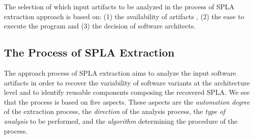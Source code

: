 \documentclass[graybox]{svmult}
\begin{document}
The selection of which input artifacts to be analyzed in the process of SPLA extraction approach is based on: (1) the availability of artifacts , (2) the ease to execute the program and (3) the decision of software architects.



\subsection{The Process of SPLA Extraction}
The approach process of SPLA extraction aims to analyze the input software artifacts in order to recover the variability of software variants at the architecture level and to identify reusable components composing the recovered SPLA. We see that the process is based on five aspects. These aspects are the \textit{automation degree} of the extraction process, the \textit{direction} of the analysis process, the \textit{type of analysis} to be performed, and the \textit{algorithm} determining the procedure of the process. 
\end{document}
